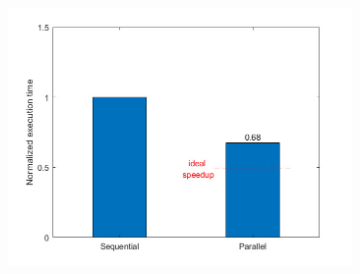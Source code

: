 \documentclass{beamer}
\begin{document}
\begin{frame}
\begin{figure}
\begin{subfigure}{.333\textwidth}
		\end{subfigure}%
		\begin{subfigure}{.333\textwidth}
			\includegraphics[width=\linewidth]{etc/test6_2.jpeg}
		\end{subfigure}%
	\end{figure}
\end{frame}
\end{document}
